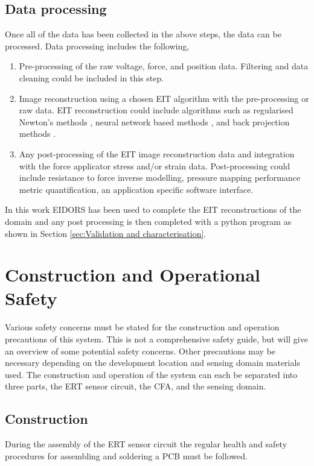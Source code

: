 \subsection{Data processing}
Once all of the data has been collected in the above steps, the data can be processed. Data processing includes the following,
\begin{enumerate}
\item Pre-processing of the raw voltage, force, and position data. Filtering and data cleaning could be included in this step.
\item Image reconstruction using a chosen EIT algorithm with the pre-processing or raw data. EIT reconstruction could include algorithms such as regularised Newton's methods \cite{Lionheart2004}, neural network based methods \cite{Biasi2022, Husain2021}, and back projection methods \cite{Avis1992}.
\item Any post-processing of the EIT image reconstruction data and integration with the force applicator stress and/or strain data. Post-processing could include resistance to force inverse modelling, pressure mapping performance metric quantification, an application specific software interface.
\end{enumerate}
In this work EIDORS \cite{Sherry2006} has been used to complete the EIT reconstructions of the domain and any post processing is then completed with a python program as shown in Section \ref{sec:Validation and characterisation}.



\section{Construction and Operational Safety}
Various safety concerns must be stated for the construction and operation precautions of this system. This is not a comprehensive safety guide, but will give an overview of some potential safety concerns. Other precautions may be necessary depending on the development location and sensing domain materials used. The construction and operation of the system can each be separated into three parts, the ERT sensor circuit, the CFA, and the sensing domain.


\subsection{Construction}
During the assembly of the ERT sensor circuit the regular health and safety procedures for assembling and soldering a PCB must be followed.


